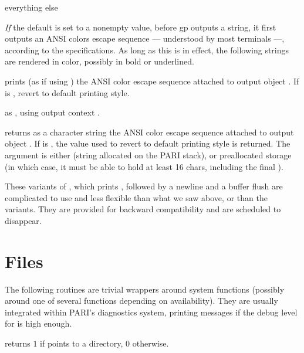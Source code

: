 \item {} everything else

\emph{If} the  default is set to a nonempty value, before gp
outputs a string, it first outputs an ANSI colors escape sequence ---
understood by most terminals ---, according to the 
specifications. As long as this is in effect, the following strings are
rendered in color, possibly in bold or underlined.

 prints (as if using ) the ANSI
color escape sequence attached to output object . If  is
, revert to default printing style.

 as ,
using output context .

 returns as a character
string the ANSI color escape sequence attached to output object .
If  is , the value used to revert to default printing
style is returned. The argument  is either  (string
allocated on the PARI stack), or preallocated storage (in which case, it must
be able to hold at least 16 chars, including the final ).


These variants of , which prints , followed by
a newline and a buffer flush are complicated to use and less flexible
than what we saw above, or than the  variants. They are
provided for backward compatibility and are scheduled to disappear.




\section{Files}

The following routines are trivial wrappers around system functions
(possibly around one of several functions depending on availability).
They are usually integrated within PARI's diagnostics system, printing
messages if the debug level for  is high enough.

 returns $1$ if  points to
a directory, $0$ otherwise.

